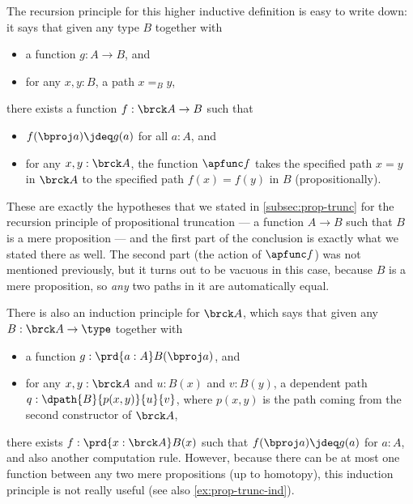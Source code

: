 The recursion principle for this higher inductive definition is easy to write down: it says that given any type $B$ together with
\begin{itemize}
\item a function $g:A\to B$, and
\item for any $x,y:B$, a path $x=_B y$,
\end{itemize}
there exists a function $f:\brck A \to B$ such that
\begin{itemize}
\item $f(\bproj a) \jdeq g(a)$ for all $a:A$, and
\item for any $x,y:\brck A$, the function $\apfunc f$ takes the specified path $x=y$ in $\brck A$ to the specified path $f(x) = f(y)$ in $B$ (propositionally).
\end{itemize}
%
These are exactly the hypotheses that we stated in \cref{subsec:prop-trunc} for the recursion principle of propositional truncation --- a function $A\to B$ such that $B$ is a mere proposition --- and the first part of the conclusion is exactly what we stated there as well.
The second part (the action of $\apfunc f$) was not mentioned previously, but it turns out to be vacuous in this case, because $B$ is a mere proposition, so \emph{any} two paths in it are automatically equal.

%
There is also an induction principle for $\brck A$, which says that given any $B:\brck A \to \type$ together with
\begin{itemize}
\item a function $g:\prd{a:A} B(\bproj a)$, and
\item for any $x,y:\brck A$ and $u:B(x)$ and $v:B(y)$, a dependent path $q:\dpath{B}{p(x,y)}{u}{v}$, where $p(x,y)$ is the path coming from the second constructor of $\brck A$,
\end{itemize}
there exists $f:\prd{x:\brck A} B(x)$ such that $f(\bproj a)\jdeq g(a)$ for $a:A$, and also another computation rule.
However, because there can be at most one function between any two mere propositions (up to homotopy), this induction principle is not really useful (see also \cref{ex:prop-trunc-ind}).

%
%

